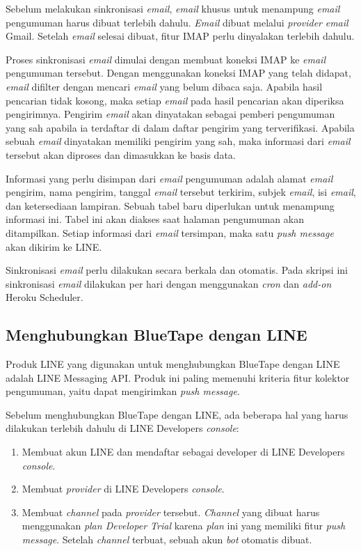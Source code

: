 	Sebelum melakukan sinkronisasi \textit{email}, \textit{email} khusus untuk menampung \textit{email} pengumuman harus dibuat terlebih dahulu. \textit{Email} dibuat melalui \textit{provider} \textit{email} Gmail. Setelah \textit{email} selesai dibuat, fitur IMAP perlu dinyalakan terlebih dahulu.
	
	Proses sinkronisasi \textit{email} dimulai dengan membuat koneksi IMAP ke \textit{email} pengumuman tersebut. Dengan menggunakan koneksi IMAP yang telah didapat, \textit{email} difilter dengan mencari \textit{email} yang belum dibaca saja. Apabila hasil pencarian tidak kosong, maka setiap \textit{email} pada hasil pencarian akan diperiksa pengirimnya. Pengirim \textit{email} akan dinyatakan sebagai pemberi pengumuman yang sah apabila ia terdaftar di dalam daftar pengirim yang terverifikasi. Apabila sebuah \textit{email} dinyatakan memiliki pengirim yang sah, maka informasi dari \textit{email} tersebut akan diproses dan dimasukkan ke basis data.
	
	Informasi yang perlu disimpan dari \textit{email} pengumuman adalah alamat \textit{email} pengirim, nama pengirim, tanggal \textit{email} tersebut terkirim, subjek \textit{email}, isi \textit{email}, dan ketersediaan lampiran. Sebuah tabel baru diperlukan untuk menampung informasi ini. Tabel ini akan diakses saat halaman pengumuman akan ditampilkan. Setiap informasi dari \textit{email} tersimpan, maka satu \textit{push message} akan dikirim ke LINE.
	
	Sinkronisasi \textit{email} perlu dilakukan secara berkala dan otomatis. Pada skripsi ini sinkronisasi \textit{email} dilakukan per hari dengan menggunakan \textit{cron} dan \textit{add-on} Heroku Scheduler.
	
\subsection{Menghubungkan BlueTape dengan LINE}
\label{sec:analisisline}
	Produk LINE yang digunakan untuk menghubungkan BlueTape dengan LINE adalah LINE Messaging API. Produk ini paling memenuhi kriteria fitur kolektor pengumuman, yaitu dapat mengirimkan \textit{push message}.
	
	Sebelum menghubungkan BlueTape dengan LINE, ada beberapa hal yang harus dilakukan terlebih dahulu di LINE Developers \textit{console}: 
	\begin{enumerate}
		\item Membuat akun LINE dan mendaftar sebagai developer di LINE Developers \textit{console}.
		\item Membuat \textit{provider} di LINE Developers \textit{console}.
		\item Membuat \textit{channel} pada \textit{provider} tersebut. \textit{Channel} yang dibuat harus menggunakan \textit{plan Developer Trial} karena \textit{plan} ini yang memiliki fitur \textit{push message}. Setelah \textit{channel} terbuat, sebuah akun \textit{bot} otomatis dibuat.
	\end{enumerate}
	

